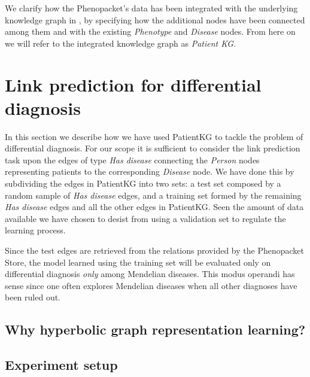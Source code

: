 We clarify how the Phenopacket's data has been integrated with the underlying knowledge graph in , by specifying how the additional nodes have been connected among them and with the existing \emph{Phenotype} and \emph{Disease} nodes. From here on we will refer to the integrated knowledge graph as \emph{Patient KG}.



\section{Link prediction for differential diagnosis}\label{sec:linkPredictionDiffDiagnosis}
In this section we describe how we have used PatientKG to tackle the problem of differential diagnosis. For our scope it is sufficient to consider the link prediction task upon the edges of type \emph{Has disease} connecting the \emph{Person} nodes representing patients to the corresponding \emph{Disease} node. We have done this by subdividing the edges in PatientKG into two sets: a test set composed by a random sample of \emph{Has disease} edges, and a training set formed by the remaining \emph{Has disease} edges and all the other edges in PatientKG. Seen the amount of data available we have chosen to desist from using a validation set to regulate the learning process. 

Since the test edges are retrieved from the relations provided by the Phenopacket Store, the model learned using the training set will be evaluated only on differential diagnosis \emph{only} among Mendelian diseases. This modus operandi has sense since one often explores Mendelian diseases when all other diagnoses have been ruled out. 


\subsection{Why hyperbolic graph representation learning?}\label{sec:hypPatientKG}

\subsection{Experiment setup}
